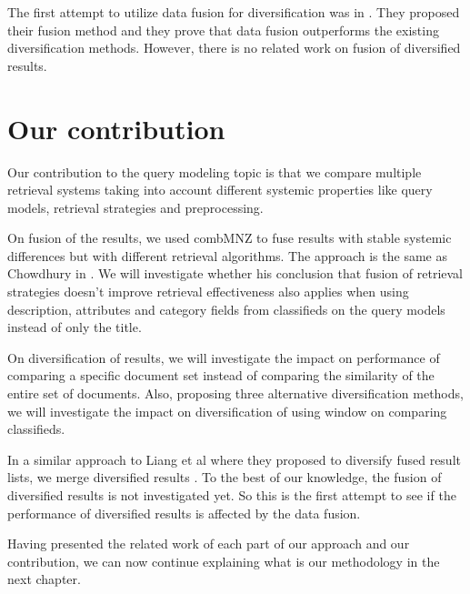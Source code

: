 The first attempt to utilize data fusion for diversification was in \cite{LiangRenMaarten}. They proposed their fusion method and they prove that data fusion outperforms the existing diversification methods. However, there is no related work on fusion of diversified results.

\section{Our contribution}
Our contribution to the query modeling topic is that we compare multiple retrieval systems taking into account different systemic properties like query models, retrieval strategies and preprocessing.

On fusion of the results, we used combMNZ to fuse results with stable systemic differences but with different retrieval algorithms. The approach is the same as Chowdhury in \cite{Chowdhury}. We will investigate whether his conclusion that fusion of retrieval strategies doesn't improve retrieval effectiveness also applies when using description, attributes and category fields from classifieds on the query models instead of only the title.

On diversification of results, we will investigate the impact on performance of comparing a specific document set instead of comparing the similarity of the entire set of documents. Also, proposing three alternative diversification methods, we will investigate the impact on diversification of using window on comparing classifieds.

In a similar approach to Liang et al where they proposed to diversify fused result lists, we merge diversified results \cite{LiangRenMaarten}. To the best of our knowledge, the fusion of diversified results is not investigated yet. So this is the first attempt to see if the performance of diversified results is affected by the data fusion.

Having presented the related work of each part of our approach and our contribution, we can now continue explaining what is our methodology in the next chapter.